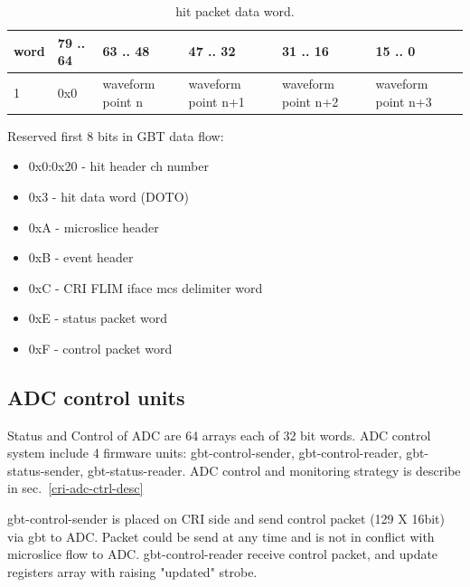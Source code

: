 \documentclass{article}
\begin{document}
\begin{table}[H]
\centering
\begin{tabular}{| l | l | l | l | l | l |}
\hline
word & 79 .. 64 & 63 .. 48 & 47 .. 32 & 31 .. 16 & 15 .. 0 \\ \hline
1 & 0x0 & waveform point n & waveform point n+1 & waveform point n+2 & waveform point n+3 \\ \hline
\end{tabular}
\caption{hit packet data word.\label{tab3}}
\end{table}

Reserved first 8 bits in GBT data flow:
\begin{itemize}
\item 0x0:0x20 - hit header ch number

\item 0x3 - hit data word (DOTO)

\item 0xA - microslice header

\item 0xB - event header

\item 0xC - CRI FLIM iface mcs delimiter word

\item 0xE - status packet word

\item 0xF - control packet word
\end{itemize}

















\subsection{ADC control units}\label{adc-control}
Status and Control of ADC are 64 arrays each of 32 bit words.
ADC control system include 4 firmware units: gbt-control-sender, gbt-control-reader, gbt-status-sender, gbt-status-reader. ADC control and monitoring strategy is describe in sec.~\ref{cri-adc-ctrl-desc}

gbt-control-sender is placed on CRI side and send control packet (129 X 16bit) via gbt to ADC. Packet could be send at any time and is not in conflict with microslice flow to ADC. gbt-control-reader receive control packet, and update registers array with raising "updated" strobe.
\end{document}
